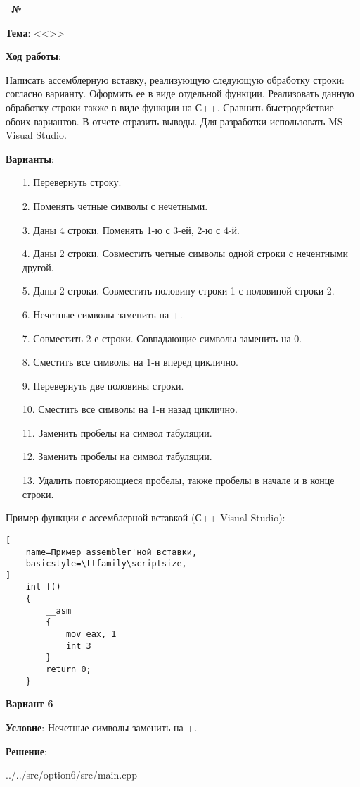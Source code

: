 \begin{center}
    \textbf{\titlePageWorkType~№\titlePageWorkNumber~\titlePageWorkPart}
\end{center}

\textbf{Тема}: <<\titlePageTopic>>


\begin{center}
    \textbf{Ход работы}:
\end{center}

Написать ассемблерную вставку, реализующую следующую обработку строки: согласно варианту.
Оформить ее в виде отдельной функции.
Реализовать данную обработку строки также в виде функции на С++.
Сравнить быстродействие обоих вариантов.
В отчете отразить выводы.
Для разработки использовать MS Visual Studio.

\textbf{Варианты}:
\begin{enumerate}
    \item[1.] Перевернуть строку.
    \item[2.] Поменять четные символы с нечетными.
    \item[3.] Даны 4 строки. Поменять 1-ю с 3-ей, 2-ю с 4-й.
    \item[4.] Даны 2 строки. Совместить четные символы одной строки с нечентными другой.
    \item[5.] Даны 2 строки. Совместить половину строки 1 с половиной строки 2.
    \item[6.] Нечетные символы заменить на +.
    \item[7.] Совместить 2-е строки. Совпадающие символы заменить на 0.
    \item[8.] Сместить все символы на 1-н вперед циклично.
    \item[9.] Перевернуть две половины строки.
    \item[10.] Сместить все символы на 1-н назад циклично.
    \item[11.] Заменить пробелы на символ табуляции.
    \item[12.] Заменить пробелы на символ табуляции.
    \item[13.] Удалить повторяющиеся пробелы, также пробелы в начале и в конце строки.
\end{enumerate}

Пример функции с ассемблерной вставкой (С++ Visual Studio): 

\begin{lstlisting}[
    name=Пример assembler'ной вставки,
    basicstyle=\ttfamily\scriptsize,
]
    int f()
    {
        __asm
        {
            mov eax, 1
            int 3
        }
        return 0;
    }
\end{lstlisting}

\newpage

\begin{center}
    \textbf{Вариант 6}
\end{center}

\textbf{Условие}:
Нечетные символы заменить на +.

\textbf{Решение}:


{../../src/option6/src/main.cpp}
